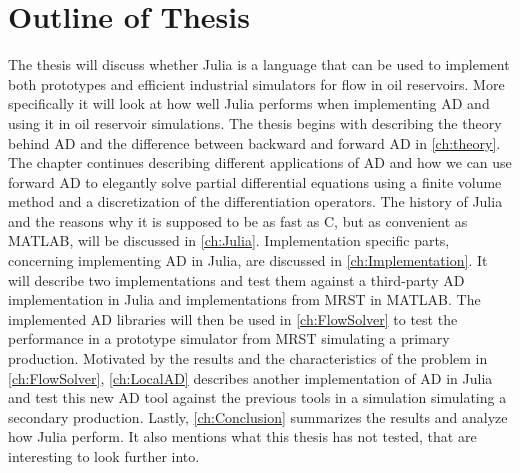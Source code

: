 \section{Outline of Thesis}
The thesis will discuss whether Julia is a language that can be used to implement both prototypes and efficient industrial simulators for flow in oil reservoirs. More specifically it will look at how well Julia performs when implementing AD and using it in oil reservoir simulations. The thesis begins with describing the theory behind AD and the difference between backward and forward AD in \autoref{ch:theory}. The chapter continues describing different applications of AD and how we can use forward AD to elegantly solve partial differential equations using a finite volume method and a discretization of the differentiation operators. The history of Julia and the reasons why it is supposed to be as fast as C, but as convenient as MATLAB, will be discussed in \autoref{ch:Julia}. Implementation specific parts, concerning implementing AD in Julia, are discussed in \autoref{ch:Implementation}. It will describe two implementations and test them against a third-party AD implementation in Julia and implementations from MRST in MATLAB. The implemented AD libraries will then be used in \autoref{ch:FlowSolver} to test the performance in a prototype simulator from MRST simulating a primary production. Motivated by the results and the characteristics of the problem in \autoref{ch:FlowSolver}, \autoref{ch:LocalAD} describes another implementation of AD in Julia and test this new AD tool against the previous tools in a simulation simulating a secondary production. Lastly, \autoref{ch:Conclusion} summarizes the results and analyze how Julia perform. It also mentions what this thesis has not tested, that are interesting to look further into.